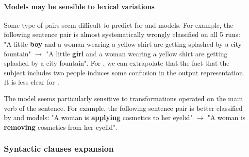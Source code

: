 \paragraph{Models may be sensible to lexical variations}

Some type of pairs seem difficult to predict for \cls and \bow models. For example, the following sentence pair is almost systematically wrongly classified on all 5 runs: "A little \textbf{boy} and a woman wearing a yellow shirt are getting splashed by a city fountain" $\rightarrow$ "A little \textbf{girl} and a woman wearing a yellow shirt are getting splashed by a city fountain". For \bow, we can extrapolate that the fact that the subject includes two people induces some confusion in the output representation. It is less clear for \cls.

The \dep model seems particularly sensitive to transformations operated on the main verb of the sentence. For example, the following sentence pair is better classified by \dep and \seq models:
"A woman is \textbf{applying} cosmetics to her eyelid" $\rightarrow$ "A woman is \textbf{removing} cosmetics from her eyelid".



\subsubsection{Syntactic clauses expansion}


